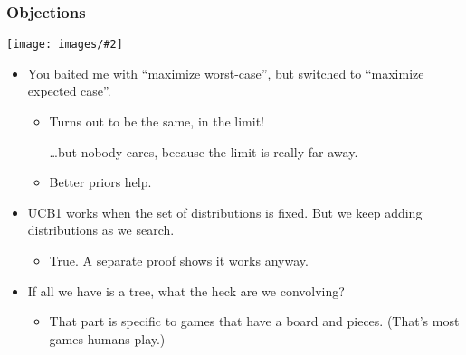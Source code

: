 \documentclass[table]{beamer}
\newcommand\img[2]{\texttt{[image: images/\#2]}}
\begin{document}
\begin{frame}
	\frametitle{Objections}
	\begin{center}
		\img{0.35}{trap-card.jpg}
	\end{center}

	\begin{itemize}
		\item You baited me with ``maximize worst-case'', but switched to
			``maximize expected case''.
			\begin{itemize}
				\item Turns out to be the same, in the limit!

					\ldots{}but nobody cares, because the limit is really
					far away.
				\item Better priors help.
			\end{itemize}
		\item UCB1 works when the set of distributions is fixed. But we keep
			adding distributions as we search.
			\begin{itemize}
				\item True. A separate proof shows it works anyway.
			\end{itemize}
		\item If all we have is a tree, what the heck are we convolving?
			\begin{itemize}
				\item That part is specific to games that have a board and
					pieces. (That's most games humans play.)
			\end{itemize}
	\end{itemize}
	\addtocounter{framenumber}{-1}
\end{frame}
\end{document}
